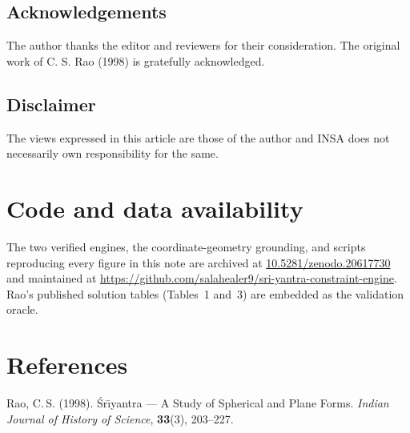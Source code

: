 \documentclass[11pt]{article}
\newcommand{\Sri}{\'{S}r\={\i}yantra}
\begin{document}
\subsection*{Acknowledgements}
The author thanks the editor and reviewers for their consideration. The original work of C. S. Rao (1998) is gratefully acknowledged.

\subsection*{Disclaimer}
The views expressed in this article are those of the author and INSA does not necessarily own responsibility for the same.

\section*{Code and data availability}
The two verified engines, the coordinate-geometry grounding, and scripts
reproducing every figure in this note are archived at
\href{https://doi.org/10.5281/zenodo.20617730}{10.5281/zenodo.20617730} and maintained at
\href{https://github.com/salahealer9/sri-yantra-constraint-engine}{https://github.com/salahealer9/sri-yantra-constraint-engine}.
Rao's published solution tables (Tables~1 and~3) are embedded as the validation oracle.

\section*{References}
\noindent Rao, C.\,S. (1998). \Sri{} --- A Study of Spherical and Plane Forms.
\emph{Indian Journal of History of Science}, \textbf{33}(3), 203--227.
\end{document}
